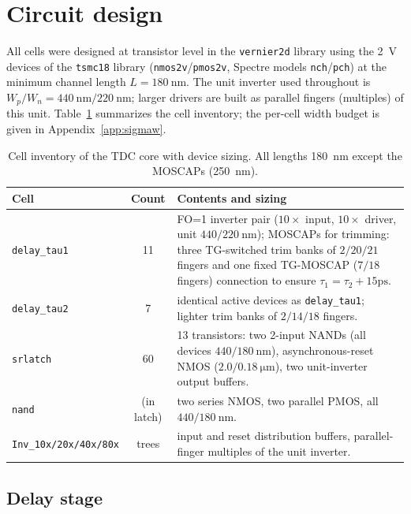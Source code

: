 \section{Circuit design}
\label{sec:circuits}

All cells were designed at transistor level in the \texttt{vernier2d} library
using the \SI{2}{\volt} devices of the \texttt{tsmc18} library
(\texttt{nmos2v}/\texttt{pmos2v}, Spectre models \texttt{nch}/\texttt{pch}) at
the minimum channel length $L=\SI{180}{\nano\meter}$.
The unit inverter used throughout is $W_p/W_n = \SI{440}{\nano\meter}/\SI{220}{\nano\meter}$;
larger drivers are built as parallel fingers (multiples) of this unit.
Table~\ref{tab:cells} summarizes the cell inventory; the per-cell width budget
is given in Appendix~\ref{app:sigmaw}.

\begin{table}[H]
\centering
\small
\caption{Cell inventory of the TDC core with device sizing. All lengths
\SI{180}{\nano\meter} except the MOSCAPs (\SI{250}{\nano\meter}).}
\label{tab:cells}
\begin{tabularx}{\textwidth}{l c X}
\toprule
\textbf{Cell} & \textbf{Count} & \textbf{Contents and sizing} \\
\midrule
\texttt{delay\_tau1} & 11 &
FO=1 inverter pair ($10\times$ input, $10\times$ driver, unit
$440/\SI{220}{\nano\meter}$); MOSCAPs for trimming: three TG-switched trim banks of
$2/20/21$ fingers and one fixed TG-MOSCAP ($7/18$ fingers) connection to ensure $\tau_1=\tau_2+15\mathrm{ps}$. \\
\texttt{delay\_tau2} & 7 &
identical active devices as \texttt{delay\_tau1}; lighter trim banks of
$2/14/18$ fingers. \\
\texttt{srlatch} & 60 &
13 transistors: two 2-input NANDs (all devices
$440/\SI{180}{\nano\meter}$), asynchronous-reset NMOS
($2.0/\SI{0.18}{\micro\meter}$), two unit-inverter output buffers. \\
\texttt{nand} & (in latch) &
two series NMOS, two parallel PMOS, all $440/\SI{180}{\nano\meter}$. \\
\texttt{Inv\_10x/20x/40x/80x} & trees &
input and reset distribution buffers, parallel-finger multiples of the unit
inverter. \\
\bottomrule
\end{tabularx}
\end{table}

\subsection{Delay stage}
\label{sec:delaycell}


